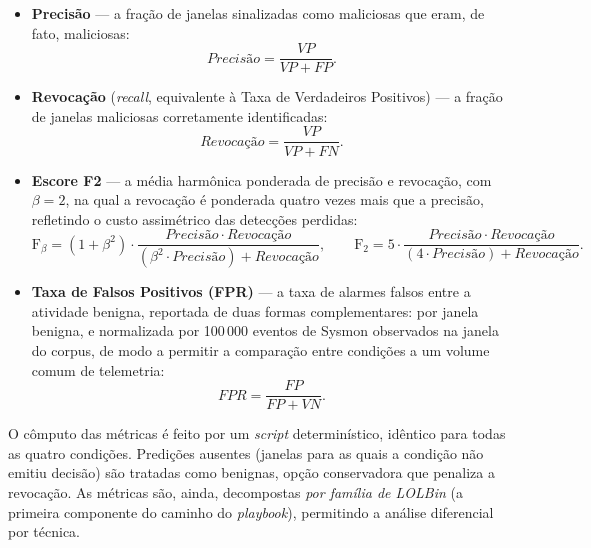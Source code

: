 \begin{itemize}
    \item \textbf{Precisão} --- a fração de janelas sinalizadas como maliciosas
    que eram, de fato, maliciosas:
    \begin{equation}
    \mathit{Precisão} = \frac{\mathit{VP}}{\mathit{VP} + \mathit{FP}}.
    \label{eq:met-precisao}
    \end{equation}
    \item \textbf{Revocação} (\textit{recall}, equivalente à Taxa de Verdadeiros
    Positivos) --- a fração de janelas maliciosas corretamente identificadas:
    \begin{equation}
    \mathit{Revocação} = \frac{\mathit{VP}}{\mathit{VP} + \mathit{FN}}.
    \label{eq:met-revocacao}
    \end{equation}
    \item \textbf{Escore F2} --- a média harmônica ponderada de precisão e
    revocação, com $\beta = 2$, na qual a revocação é ponderada quatro vezes mais
    que a precisão, refletindo o custo assimétrico das detecções perdidas:
    \begin{equation}
    \mathrm{F}_{\beta} = (1 + \beta^{2}) \cdot
    \frac{\mathit{Precisão} \cdot \mathit{Revocação}}
         {(\beta^{2} \cdot \mathit{Precisão}) + \mathit{Revocação}},
    \qquad
    \mathrm{F}_{2} = 5 \cdot
    \frac{\mathit{Precisão} \cdot \mathit{Revocação}}
         {(4 \cdot \mathit{Precisão}) + \mathit{Revocação}}.
    \label{eq:met-f2}
    \end{equation}
    \item \textbf{Taxa de Falsos Positivos (FPR)} --- a taxa de alarmes falsos
    entre a atividade benigna, reportada de duas formas complementares: por
    janela benigna, e normalizada por 100\,000 eventos de Sysmon observados na
    janela do corpus, de modo a permitir a comparação entre condições a um volume
    comum de telemetria:
    \begin{equation}
    \mathit{FPR} = \frac{\mathit{FP}}{\mathit{FP} + \mathit{VN}}.
    \label{eq:met-fpr}
    \end{equation}
\end{itemize}

O cômputo das métricas é feito por um \textit{script} determinístico, idêntico
para todas as quatro condições. Predições ausentes (janelas para as quais a
condição não emitiu decisão) são tratadas como benignas, opção conservadora que
penaliza a revocação. As métricas são, ainda, decompostas \emph{por família de
LOLBin} (a primeira componente do caminho do \textit{playbook}), permitindo a
análise diferencial por técnica.

